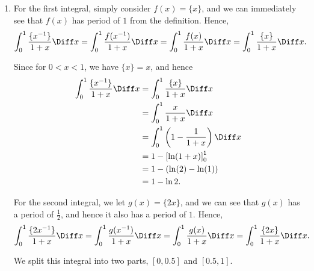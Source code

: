\begin{enumerate}
    \item For the first integral, simply consider \(f(x) = \{x\}\), and we can immediately see that \(f(x)\) has period of \(1\) from the definition. Hence,
          \[
              \int_{0}^{1} \frac{\{x^{-1}\}}{1 + x} \Diff x = \int_{0}^{1} \frac{f(x^{-1})}{1 + x} \Diff x = \int_{0}^{1} \frac{f(x)}{1 + x} \Diff x = \int_{0}^{1} \frac{\{x\}}{1 + x} \Diff x.
          \]

          Since for \(0 < x < 1\), we have \(\{x\} = x\), and hence
          \begin{align*}
              \int_{0}^{1} \frac{\{x^{-1}\}}{1 + x} \Diff x & = \int_{0}^{1} \frac{\{x\}}{1 + x} \Diff x              \\
                                                            & = \int_{0}^{1} \frac{x}{1 + x} \Diff x                  \\
                                                            & = \int_{0}^{1} \left(1 - \frac{1}{1 + x}\right) \Diff x \\
                                                            & = 1 - \left[\ln(1 + x)\right]_{0}^{1}                   \\
                                                            & = 1 - (\ln(2) - \ln(1))                                 \\
                                                            & = 1 - \ln 2.
          \end{align*}

          For the second integral, we let \(g(x) = \{2x\}\), and we can see that \(g(x)\) has a period of \(\frac{1}{2}\), and hence it also has a period of \(1\). Hence,
          \[
              \int_{0}^{1} \frac{\{2x^{-1}\}}{1 + x} \Diff x = \int_{0}^{1} \frac{g(x^{-1})}{1 + x} \Diff x = \int_{0}^{1} \frac{g(x)}{1 + x} \Diff x = \int_{0}^{1} \frac{\{2x\}}{1 + x} \Diff x.
          \]

          We split this integral into two parts, \([0, 0.5]\) and \([0.5, 1]\).


\end{enumerate}
